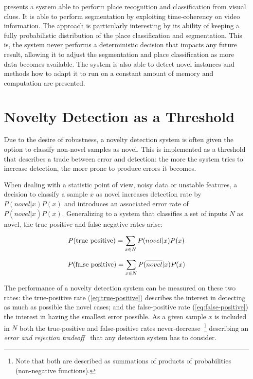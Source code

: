 \cite{ranganathan2010pliss} presents a system able to perform place recognition
and classification from visual clues. It is able to perform segmentation by
exploiting time-coherency on video information. The approach is particularly
interesting by its ability of keeping a fully probabilistic distribution of
the place classification and segmentation. This is, the system never performs
a deterministic decision that impacts any future result, allowing it to adjust
the segmentation and place classification as more data becomes available.
The system is also able to detect novel instances and methods how to adapt it
to run on a constant amount of memory and computation are presented.

\section{Novelty Detection as a Threshold}
Due to the desire of robustness, a novelty detection system is often given the option
to classify non-novel samples as novel. This is implemented as a threshold that describes a trade
between error and detection: the more the system tries to increase detection, the more
prone to produce errors it becomes.

When dealing with a statistic point of view, noisy data or unstable features,
a decision to classify a sample $x$ as novel increases detection rate by
$P(novel|x)P(x)$ and introduces an associated error rate of $P(\overline{novel}|x)P(x)$.
Generalizing to a system that classifies a set of inputs $N$ as novel, the
true positive and false negative rates arise:

\begin{equation}
\label{eq:true-positive}
P(\textnormal{true positive}) = \sum_{x \in N}{P(novel|x)P(x)}
\end{equation}

\begin{equation}
\label{eq:false-positive}
P(\textnormal{false positive}) = \sum_{x \in N}{P(\overline{novel}|x)P(x)}
\end{equation}

The performance of a novelty detection system can be measured on these two
rates: the true-positive rate (\autoref{eq:true-positive}) describes the
interest in detecting as much as possible the novel cases;
and the false-positive rate (\autoref{eq:false-positive}) the interest in
having the smallest error possible.
As a given sample $x$ is included in $N$ both the true-positive and
false-positive rates never-decrease~\footnote{Note that both are described as
summations of products of probabilities (non-negative functions).} describing an
\emph{error and rejection tradeoff}~\cite{chow1970optimum} that any detection
system has to consider.

